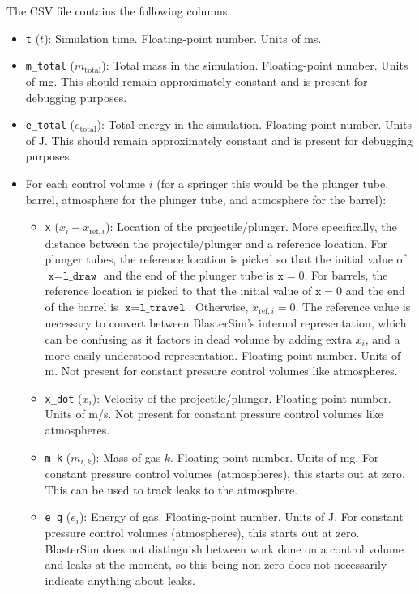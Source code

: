 The CSV file contains the following columns:
\begin{itemize}
\item \texttt{t} ($t$): Simulation time.
Floating-point number.
Units of ms.
\item \texttt{m\_total} ($m_\text{total}$): Total mass in the simulation.
Floating-point number.
Units of mg.
This should remain approximately constant and is present for debugging purposes.
\item \texttt{e\_total} ($e_\text{total}$): Total energy in the simulation.
Floating-point number.
Units of J.
This should remain approximately constant and is present for debugging purposes.
\item For each control volume $i$ (for a springer this would be the plunger tube, barrel, atmosphere for the plunger tube, and atmosphere for the barrel):
\begin{itemize}
    \item \texttt{x} ($x_i - x_{\text{ref},i}$): Location of the projectile/plunger.
    More specifically, the distance between the projectile/plunger and a reference location.
    For plunger tubes, the reference location is picked so that the initial value of $\texttt{x} = \texttt{l\_draw}$ and the end of the plunger tube is $\texttt{x} = 0$.
    For barrels, the reference location is picked to that the initial value of $\texttt{x} = 0$ and the end of the barrel is $\texttt{x} = \texttt{l\_travel}$.
    Otherwise, $x_{\text{ref},i} = 0$.
    The reference value is necessary to convert between BlasterSim's internal representation, which can be confusing as it factors in dead volume by adding extra $x_i$, and a more easily understood representation.
    Floating-point number.
    Units of m.
    Not present for constant pressure control volumes like atmospheres.
    \item \texttt{x\_dot} ($\dot{x}_i$): Velocity of the projectile/plunger.
    Floating-point number.
    Units of m/s.
    Not present for constant pressure control volumes like atmospheres.
    \item \texttt{m\_k} ($m_{i,k}$): Mass of gas $k$.
    Floating-point number.
    Units of mg.
    For constant pressure control volumes (atmospheres), this starts out at zero.
    This can be used to track leaks to the atmosphere.
    \item \texttt{e\_g} ($e_i$): Energy of gas.
    Floating-point number.
    Units of J.
    For constant pressure control volumes (atmospheres), this starts out at zero.
    BlasterSim does not distinguish between work done on a control volume and leaks at the moment, so this being non-zero does not necessarily indicate anything about leaks.

\end{itemize}
\end{itemize}
